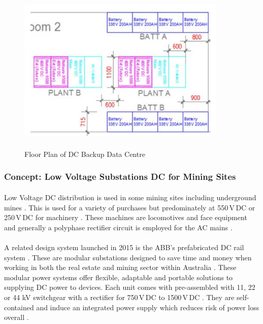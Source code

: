 \begin{figure}[H]
\hfill\includegraphics[width = 100mm, height = 80mm]{images/DC_Centre}\hspace*{\fill}
\caption{{Floor Plan of DC Backup Data Centre \cite{Lisy2015}}}
\label{fig:DC_Centre}
\end{figure} 

\subsubsection{Concept: Low Voltage Substations DC for Mining Sites}

\paragraph{}
Low Voltage DC distribution is used in some mining sites including underground mines \cite{Morley1990}. This is used for a variety of purchases but predominately at 550\,V\,DC or 250\,V\,DC for machinery \cite{Morley1990}. These machines are locomotives and face equipment and generally a polyphase rectifier circuit is employed for the AC mains \cite{Morley1990}.

\paragraph{}
A related design system launched in 2015 is the ABB's prefabricated DC rail system \cite{website:ProQuest1}. These are modular substations designed to save time and money when working in both the real estate and mining sector within Australia \cite{website:ProQuest1}. These modular power systems offer flexible, adaptable and portable solutions to supplying DC power to devices. Each unit comes with pre-assembled with 11, 22 or 44 kV switchgear with a rectifier for 750\,V\,DC to 1500\,V\,DC \cite{website:ProQuest1}. They are self-contained and induce an integrated power supply which reduces risk of power loss overall \cite{website:ProQuest1}.            

